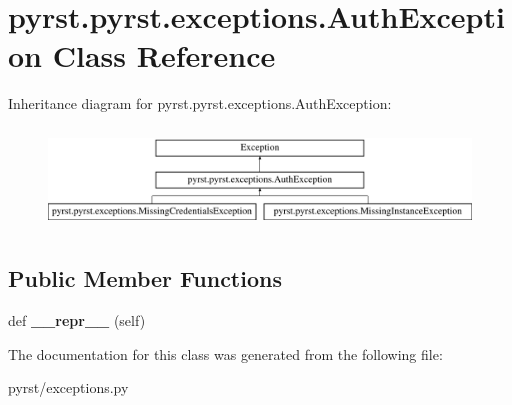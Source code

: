 \hypertarget{classpyrst_1_1pyrst_1_1exceptions_1_1_auth_exception}{}\section{pyrst.\+pyrst.\+exceptions.\+Auth\+Exception Class Reference}
\label{classpyrst_1_1pyrst_1_1exceptions_1_1_auth_exception}
Inheritance diagram for pyrst.\+pyrst.\+exceptions.\+Auth\+Exception\+:\begin{figure}[H]
\begin{center}
\leavevmode
\includegraphics[height=2.709677cm]{classpyrst_1_1pyrst_1_1exceptions_1_1_auth_exception}
\end{center}
\end{figure}
\subsection*{Public Member Functions}
\begin{DoxyCompactItemize}
\item 
\hypertarget{classpyrst_1_1pyrst_1_1exceptions_1_1_auth_exception_a60275b6315178b392e46755c9e38246e}{}def {\bfseries \+\_\+\+\_\+repr\+\_\+\+\_\+} (self)\label{classpyrst_1_1pyrst_1_1exceptions_1_1_auth_exception_a60275b6315178b392e46755c9e38246e}

\end{DoxyCompactItemize}


The documentation for this class was generated from the following file\+:\begin{DoxyCompactItemize}
\item 
pyrst/exceptions.\+py\end{DoxyCompactItemize}
